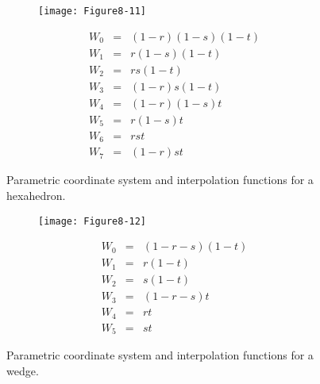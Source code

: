 \begin{figure}[!htb]
	\centering
	\begin{subfigure}{0.48\linewidth}
		\centering
		\texttt{[image: Figure8-11]}
		\caption*{}
	\end{subfigure}
	\hfill
	\begin{subfigure}{0.48\linewidth}
		\centering
		\begin{equation*}
		\begin{array}{lll}
		W_0 &=& (1 - r)(1 - s)(1 - t) \\
		W_1 &=& r (1-s)(1 -t) \\
		W_2 &=& rs (1-t) \\
		W_3 &=& (1-r)s(1 - t) \\
		W_4 &=& (1 - r)(1 - s) t \\
		W_5 &=& r (1-s)t \\
		W_6 &=& rs t \\
		W_7 &=& (1-r)st	
		\end{array}
		\end{equation*}
	\end{subfigure}%
	\caption{Parametric coordinate system and interpolation functions for a hexahedron.}
	\label{fig:Figure8-11}
\end{figure}

\begin{figure}[!htb]
	\centering
	\begin{subfigure}{0.48\linewidth}
		\centering
		\texttt{[image: Figure8-12]}
		\caption*{}
	\end{subfigure}
	\hfill
	\begin{subfigure}{0.48\linewidth}
		\centering
		\begin{equation*}
		\begin{array}{lll}
		W_0 &=& (1 - r - s)(1 - t) \\
		W_1 &=& r (1-t) \\
		W_2 &=& s (1 - t) \\
		W_3 &=& (1 - r - s)t \\
		W_4 &=& r t \\
		W_5 &=& s t	
		\end{array}
		\end{equation*}
	\end{subfigure}%
	\caption{Parametric coordinate system and interpolation functions for a wedge.}
	\label{fig:Figure8-12}
\end{figure}

